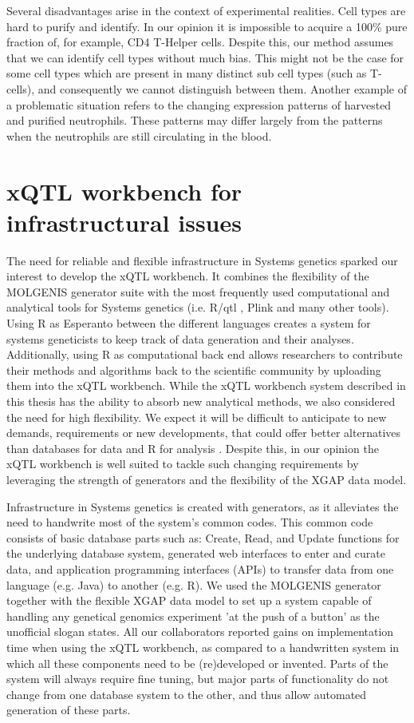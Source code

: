 Several disadvantages arise in the context of experimental realities. Cell types are hard to purify and identify. In our opinion it is impossible 
to acquire a 100\% pure fraction of, for example, CD4 T-Helper cells. Despite this, our method assumes that we can identify cell types without 
much bias. This might not be the case for some cell types which are present in many distinct sub cell types (such as T-cells), and consequently 
we cannot distinguish between them. Another example of a problematic situation refers to the changing expression patterns of harvested and purified 
neutrophils. These patterns may differ largely from the patterns when the neutrophils are still circulating in the blood.

\section{xQTL workbench for infrastructural issues}
The need for reliable and flexible infrastructure in Systems genetics sparked our interest to develop the xQTL workbench. It combines the flexibility 
of the MOLGENIS generator suite \cite{Swertz:2004} with the most frequently used computational and analytical tools for Systems genetics (i.e. R/qtl 
\cite{Broman:2003, Arends:2010}, Plink \cite{Purcell:2007} and many other tools). Using R as Esperanto between the different languages creates a system 
for systems geneticists to keep track of data generation and their analyses. Additionally, using R as computational back end allows researchers to 
contribute their methods and algorithms back to the scientific community by uploading them into the xQTL workbench. While the xQTL workbench system 
described in this thesis has the ability to absorb new analytical methods, we also considered the need for high flexibility. We expect it will be 
difficult to anticipate to new demands, requirements or new developments, that could offer better alternatives than databases for data and R for 
analysis \cite{R:2005}. Despite this, in our opinion the xQTL workbench is well suited to tackle such changing requirements by leveraging the strength of 
generators and the flexibility of the XGAP data model.

Infrastructure in Systems genetics is created with generators, as it alleviates the need to handwrite most of the system’s common codes. This common 
code consists of basic database parts such as: Create, Read, and Update functions for the underlying database system, generated web interfaces to enter 
and curate data, and application programming interfaces (APIs) to transfer data from one language (e.g. Java) to another (e.g. R). We used the MOLGENIS 
generator together with the flexible XGAP data model to set up a system capable of handling any genetical genomics experiment 'at the push of a button' 
as the unofficial slogan states. All our collaborators reported gains on implementation time when using the xQTL workbench, as compared to a handwritten 
system in which all these components need to be (re)developed or invented. Parts of the system will always require fine tuning, but major parts of 
functionality do not change from one database system to the other, and thus allow automated generation of these parts.

